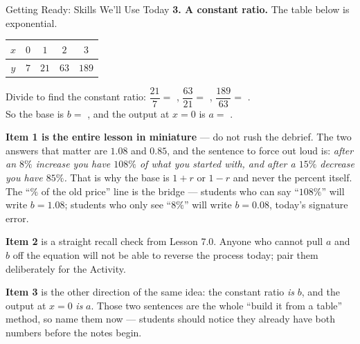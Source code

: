 \documentclass[10pt]{article}
\begin{document}
\begin{notesbox}{Getting Ready: Skills We'll Use Today}
\vspace{2pt}
\textbf{3. A constant ratio.} The table below is exponential.
\begin{center}
\renewcommand{\arraystretch}{1.3}
\begin{tabular}{|c|c|c|c|c|}
\hline
$x$ & $0$ & $1$ & $2$ & $3$ \\ \hline
$y$ & $7$ & $21$ & $63$ & $189$ \\ \hline
\end{tabular}
\end{center}
Divide to find the constant ratio: $\dfrac{21}{7}=$ , \; $\dfrac{63}{21}=$
, \; $\dfrac{189}{63}=$ . \\[3pt]
So the base is $b=$ , and the output at $x=0$ is $a=$ .

\end{notesbox}

\begin{teachernote}
\textbf{Item 1 is the entire lesson in miniature} --- do not rush the debrief. The two answers that
matter are $1.08$ and $0.85$, and the sentence to force out loud is: \emph{after an $8\%$ increase you
have $108\%$ of what you started with, and after a $15\%$ decrease you have $85\%$.} That is why the
base is $1+r$ or $1-r$ and never the percent itself. The ``$\%$ of the old price'' line is the bridge
--- students who can say ``$108\%$'' will write $b=1.08$; students who only see ``$8\%$'' will write
$b=0.08$, today's signature error.

\textbf{Item 2} is a straight recall check from Lesson 7.0. Anyone who cannot pull $a$ and $b$ off the
equation will not be able to reverse the process today; pair them deliberately for the Activity.

\textbf{Item 3} is the other direction of the same idea: the constant ratio \emph{is} $b$, and the
output at $x=0$ \emph{is} $a$. Those two sentences are the whole ``build it from a table'' method, so
name them now --- students should notice they already have both numbers before the notes begin.
\end{teachernote}
\end{document}
